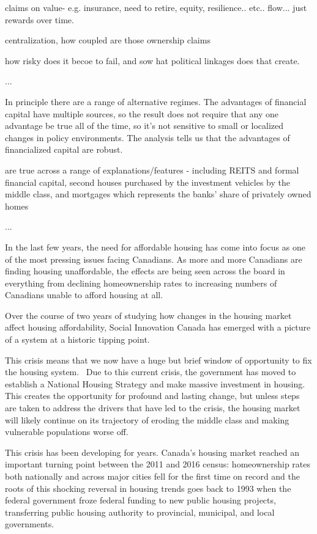 claims on value- e.g. insurance, need to retire, equity, resilience.. etc.. flow... just rewards over time.

centralization, 
how coupled are those ownership claims

how risky does it becoe to fail, and sow hat political linkages does that create. 


...

In principle there are a range of alternative regimes.
The advantages of financial capital have multiple sources, so the result does not require that any one advantage be true all of the time, so it's not sensitive to small or localized changes in policy environments. The analysis tells us that the advantages of financialized capital are robust.

are true across a range of explanations/features - including REITS and formal financial capital, second houses purchased by the investment vehicles by the middle class, and mortgages which represents the banks' share of privately owned homes

...


In the last few years, the need for affordable housing has come into focus as one of the most pressing issues facing Canadians. As more and more Canadians are finding housing unaffordable, the effects are being seen across the board in everything from declining homeownership rates to increasing numbers of Canadians unable to afford housing at all.

Over the course of two years of studying how changes in the housing market affect housing affordability, Social Innovation Canada has emerged with a picture of a system at a historic tipping point. 

This crisis means that we now have a huge but brief window of opportunity to fix the housing system.  Due to this current crisis, the government has moved to establish a National Housing Strategy and make massive investment in housing. This creates the opportunity for profound and lasting change, but unless steps are taken to address the drivers that have led to the crisis, the housing market will likely continue on its trajectory of eroding the middle class and making vulnerable populations worse off.   

This crisis has been developing for years. Canada's housing market reached an important turning point between the 2011 and 2016 census: homeownership rates both nationally and across major cities fell for the first time on record and the roots of this shocking reversal in housing trends goes back to 1993 when the federal government froze federal funding to new public housing projects, transferring public housing authority to provincial, municipal, and local governments. 

